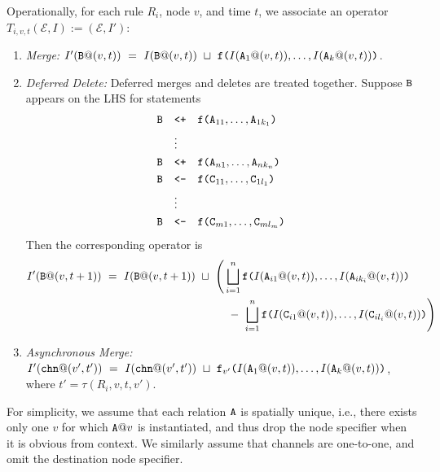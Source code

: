 Operationally, for each rule $R_i$, node $v$, and time $t$, we associate an operator $T_{i,v,t}(\mathcal{E}, I) := (\mathcal{E}, I')$:
\begin{enumerate}
\item\emph{Merge:} $I'(\tt{B}@(v,t)) ~=~ I(\tt{B}@(v,t)) ~\sqcup~ \tt{f(}I(\tt{A}_1@(v,t)),\dots,I(\tt{A}_k@(v,t))\tt{)}$.
\item\emph{Deferred Delete:} Deferred merges and deletes are treated together.
Suppose $\tt{B}$ appears on the LHS for statements
\begin{align*}
\tt{B} &\quad\tt{<+}\quad \tt{f(}\tt{A}_{11},\dots,\tt{A}_{1k_1}\tt{)}\\
&\quad\vdots\\
\tt{B} &\quad\tt{<+}\quad \tt{f(}\tt{A}_{n1},\dots,\tt{A}_{nk_n}\tt{)}\\
\tt{B} &\quad\tt{<-}\quad \tt{f(}\tt{C}_{11},\dots,\tt{C}_{1l_1}\tt{)}\\
&\quad\vdots\\
\tt{B} &\quad\tt{<-}\quad \tt{f(}\tt{C}_{m1},\dots,\tt{C}_{ml_m}\tt{)}
\end{align*}
Then the corresponding operator is
\begin{align*}
I'(\tt{B}@(v,t+1)) ~=~ I(\tt{B}@(v,t+1)) ~\sqcup~ \Bigg(
&\bigsqcup_{i=1}^n \tt{f(}I(\tt{A}_{i1}@(v,t)),\dots,I(\tt{A}_{ik_i}@(v,t))\tt{)}\\
&~-~
\bigsqcup_{i=1}^n \tt{f(}I(\tt{C}_{i1}@(v,t)),\dots,I(\tt{C}_{il_i}@(v,t))\tt{)}
\Bigg)
\end{align*}
\item\emph{Asynchronous Merge:} $I'(\tt{chn}@(v',t')) ~=~ I(\tt{chn}@(v',t')) ~\sqcup~ \tt{f}_{v'}\tt{(}I(\tt{A}_1@(v,t)),\dots,I(\tt{A}_k@(v,t))\tt{)}$, where $t' = \tau(R_i, v, t, v')$.
\end{enumerate}
For simplicity, we assume that each relation $\tt{A}$ is spatially unique, i.e., there exists only one $v$ for which $\tt{A}@v$ is instantiated, and thus drop the node specifier when it is obvious from context.
We similarly assume that channels are one-to-one, and omit the destination node specifier.

